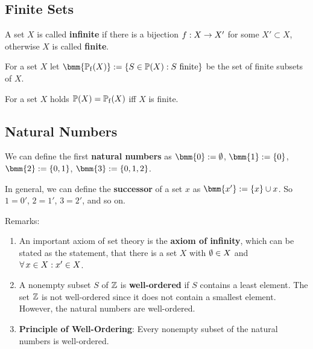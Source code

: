 \documentclass[12pt]{book}
\begin{document}
\subsection{Finite Sets}
\label{sec:Finite sets}

\begin{defi}\label{def:finite}
      A set $X$ is called \textbf{infinite} if there is a bijection $f: X \rightarrow X'$ for some $X' \subset X$, otherwise $X$ is called \textbf{finite}.
\end{defi}
\begin{defi}\label{def:finitesubs}
      For a set $X$ let $\bmm{\pote(X)} := \set{S \in \pot(X) : S \text{ finite}}$ be the set of finite subsets of $X$.
\end{defi}
\begin{lem}\label{lem:finitesubs}
      For a set $X$ holds $\operatorname{\mathbb{P}}(X) = \operatorname{\mathbb{P}_f}(X)$ iff $X$ is finite.
\end{lem}
\subsection{Natural Numbers}
\label{sec:natnumbers}

\begin{defi}\label{def:natnumberssimple}
      We can define the first \textbf{natural numbers} as $\bmm{0} := \es$, $\bmm{1} := \set{0}$, $\bmm{2} := \set{0,1}$, $\bmm{3} := \set{0,1,2}$.
\end{defi}
	  \begin{defi}\label{def:successor}
      In general, we can define the \textbf{successor} of a set $x$ as $\bmm{x'} := \set{x} \cup x$. So $1 = 0'$, $2 = 1'$, $3 = 2'$, and so on.
\end{defi}
Remarks:
\begin{enumerate}
      \item An important axiom of set theory is the \textbf{axiom of infinity}, which can be stated as the statement, that there is a set $X$ with
	  $\emptyset \in X$ and $\forall\, x \in X : x' \in X$.
	  \item A nonempty subset $S$ of $\mathbb{Z}$ is  \textbf{well-ordered} if $S$ contains a least element. The set $\mathbb{Z}$ is not well-ordered since it does not 
	  contain a smallest element. However, the natural numbers are well-ordered.
	  \item \textbf{Principle of Well-Ordering}: Every nonempty subset of the natural numbers is well-ordered.
\end{enumerate}
\end{document}

